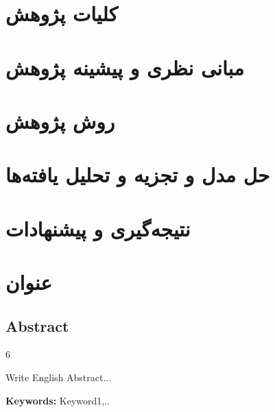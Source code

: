\documentclass[a4paper,10pt,fullpage]{report}
\begin{document}
	\section*{}
	\vspace{-3cm}
	\listoffigures{}
	\pagebreak
	

	\chapter{ کلیات پژوهش}
		
	
	\chapter{مبانی نظری و پیشینه پژوهش}

	\chapter{روش پژوهش}


	\chapter{حل مدل و تجزیه و تحلیل یافته‌ها}


	\chapter{نتیجه‌گیری و پیشنهادات}


	\pagebreak
	
	\appendix
	\chapter{عنوان}

	
 	




\begin{latin}
	\chapter*{Abstract}
	 \thispagestyle{empty} 6
	Write English Abstract...

	\textbf{Keywords:} Keyword1,..
\end{latin}
\pagebreak
\end{document}
